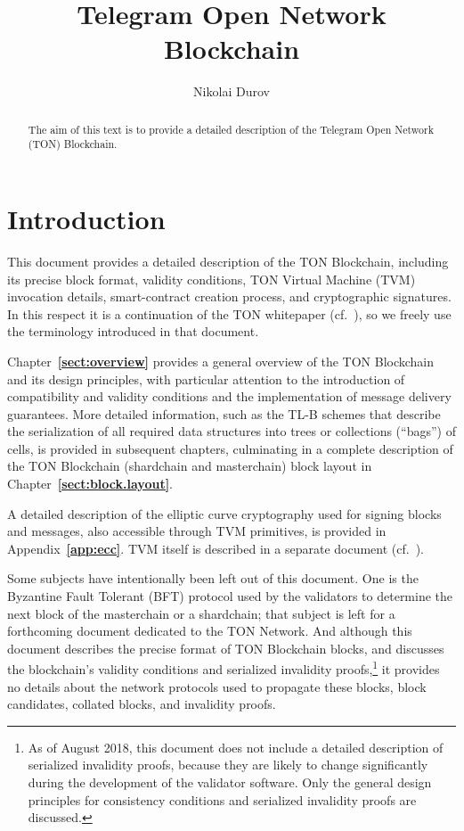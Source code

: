 \documentclass[12pt,oneside]{article}
\title{Telegram Open Network Blockchain}
\author{Nikolai Durov}
\def\refpoint#1{{\rm\textbf{\ref{#1}}}}
\let\ptref=\refpoint
\def\markbothsame#1{\fancyhead[C]{#1}}
\begin{document}
\maketitle

\begin{abstract}
  The aim of this text is to provide a detailed description of the
  Telegram Open Network (TON) Blockchain.
\end{abstract}

\section*{Introduction}
\markbothsame{Introduction}

This document provides a detailed description of the TON Blockchain, including its precise block format, validity conditions, TON Virtual Machine (TVM) invocation details, smart-contract creation process, and cryptographic signatures. In this respect it is a continuation of the TON whitepaper (cf.~\cite{TON}), so we freely use the terminology introduced in that document.

Chapter~\ptref{sect:overview} provides a general overview of the TON Blockchain and its design principles, with particular attention to the introduction of compatibility and validity conditions and the implementation of message delivery guarantees. More detailed information, such as the TL-B schemes that describe the serialization of all required data structures into trees or collections (``bags'') of cells, is provided in subsequent chapters, culminating in a complete description of the TON Blockchain (shardchain and masterchain) block layout in Chapter~\ptref{sect:block.layout}.

A detailed description of the elliptic curve cryptography used for signing blocks and messages, also accessible through TVM primitives, is provided in Appendix~\ptref{app:ecc}. TVM itself is described in a separate document (cf.~\cite{TVM}).

Some subjects have intentionally been left out of this document. One is the Byzantine Fault Tolerant (BFT) protocol used by the validators to determine the next block of the masterchain or a shardchain; that subject is left for a forthcoming document dedicated to the TON Network. And although this document describes the precise format of TON Blockchain blocks, and discusses the blockchain's validity conditions and serialized invalidity proofs,\footnote{As of August 2018, this document does not include a detailed description of serialized invalidity proofs, because they are likely to change significantly during the development of the validator software. Only the general design principles for consistency conditions and serialized invalidity proofs are discussed.}  it provides no details about the network protocols used to propagate these blocks, block candidates, collated blocks, and invalidity proofs.
\end{document}
